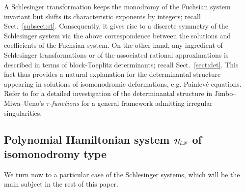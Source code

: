 \documentclass[12pt]{article}
\numberwithin{equation}{section}
\begin{document}
A Schlesinger transformation 
keeps the monodromy of the Fuchsian system invariant
but shifts its characteristic exponents by integers;
recall Sect.~\ref{subsect:st}.
Consequently, it gives rise to a discrete symmetry of the Schlesinger system
via the above correspondence between 
the solutions and coefficients of the Fuchsian system.
On the other hand,
any ingredient of Schlesinger transformations or of 
the associated rational approximations 
is described in terms of block-Toeplitz determinants;
recall Sect.~\ref{sect:det}.
This fact thus provides a natural explanation for 
the determinantal structure appearing in solutions of 
isomonodromic deformations, e.g. 
Painlev\'e equations.
Refer to \cite{imt15} for a detailed investigation of the determinantal structure in Jimbo--Miwa--Ueno's {\it $\tau$-functions} \cite{jmu81}
for a general framework 
admitting irregular singularities. 



\subsection{Polynomial Hamiltonian system ${\cal H}_{L,N}$ of isomonodromy type}

We turn now to a particular case of the Schlesinger systems,
which will be the main subject in the rest of this paper.
\end{document}
